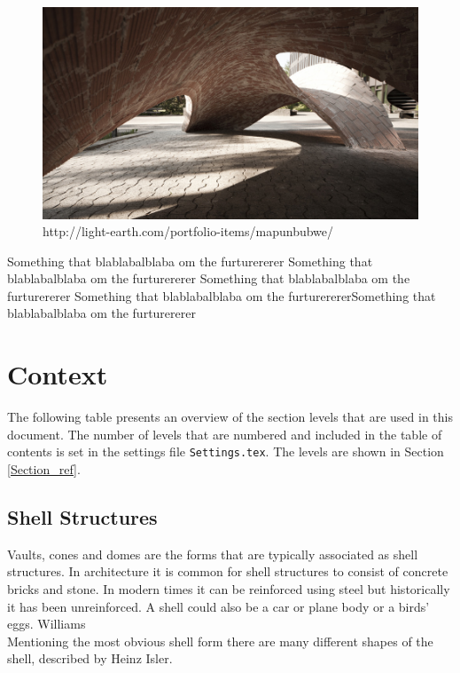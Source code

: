 \begin{figure}[H]
\centering
\includegraphics[width=0.9\linewidth ]{figure/Introduction/BlockVault.jpg}
\caption{http://light-earth.com/portfolio-items/mapunbubwe/}
\end{figure}

Something that blablabalblaba om the furturererer
Something that blablabalblaba om the furturererer
Something that blablabalblaba om the furturererer
Something that blablabalblaba om the furturerererSomething that blablabalblaba om the furturererer


\section{Context}
The following table presents an overview of the section levels that are used in this document. The number of levels that are numbered and included in the table of contents is set in the settings file \texttt{Settings.tex}. The levels are shown in Section \ref{Section_ref}.

\subsection{Shell Structures}

Vaults, cones and domes are the forms that are typically associated as shell structures. In architecture it is common for shell structures to consist of concrete bricks and stone. In modern times it can be reinforced using steel but historically it has been unreinforced. A shell could also be a car or plane body or a birds' eggs. Williams \\

Mentioning the most obvious shell form there are many different shapes of the shell, described by Heinz Isler.

